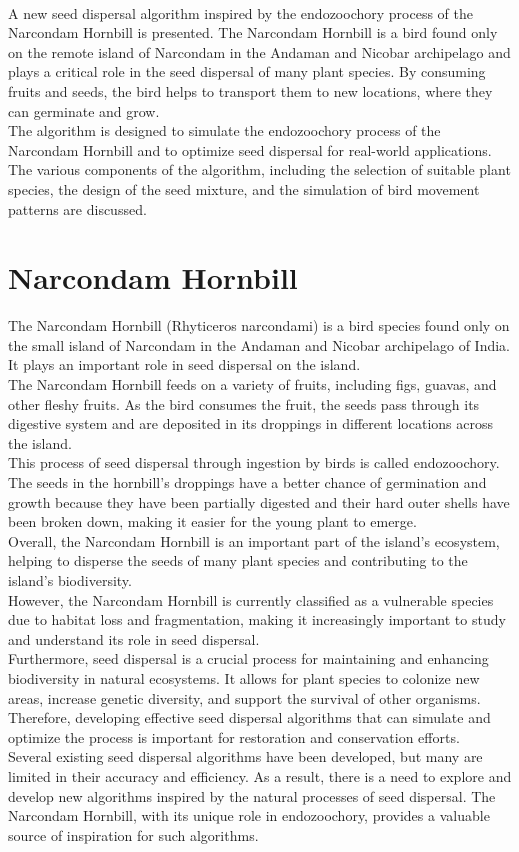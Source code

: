 \documentclass[pmlr,twocolumn,10pt]{jmlr}
\begin{document}
\\A new seed dispersal algorithm inspired by the endozoochory process of the Narcondam Hornbill is presented. The Narcondam Hornbill is a bird found only on the remote island of Narcondam in the Andaman and Nicobar archipelago and plays a critical role in the seed dispersal of many plant species. By consuming fruits and seeds, the bird helps to transport them to new locations, where they can germinate and grow. 
\\The algorithm is designed to simulate the endozoochory process of the Narcondam Hornbill and to optimize seed dispersal for real-world applications. The various components of the algorithm, including the selection of suitable plant species, the design of the seed mixture, and the simulation of bird movement patterns are discussed.
\section{Narcondam Hornbill}
The Narcondam Hornbill (Rhyticeros narcondami) is a bird species found only on the small island of Narcondam in the Andaman and Nicobar archipelago of India. It plays an important role in seed dispersal on the island.
\\The Narcondam Hornbill feeds on a variety of fruits, including figs, guavas, and other fleshy fruits. As the bird consumes the fruit, the seeds pass through its digestive system and are deposited in its droppings in different locations across the island.
\\This process of seed dispersal through ingestion by birds is called endozoochory. The seeds in the hornbill's droppings have a better chance of germination and growth because they have been partially digested and their hard outer shells have been broken down, making it easier for the young plant to emerge.
\\Overall, the Narcondam Hornbill is an important part of the island's ecosystem, helping to disperse the seeds of many plant species and contributing to the island's biodiversity.
\\However, the Narcondam Hornbill is currently classified as a vulnerable species due to habitat loss and fragmentation, making it increasingly important to study and understand its role in seed dispersal.
\\Furthermore, seed dispersal is a crucial process for maintaining and enhancing biodiversity in natural ecosystems. It allows for plant species to colonize new areas, increase genetic diversity, and support the survival of other organisms. Therefore, developing effective seed dispersal algorithms that can simulate and optimize the process is important for restoration and conservation efforts.
\\Several existing seed dispersal algorithms have been developed, but many are limited in their accuracy and efficiency. As a result, there is a need to explore and develop new algorithms inspired by the natural processes of seed dispersal. The Narcondam Hornbill, with its unique role in endozoochory, provides a valuable source of inspiration for such algorithms.
\end{document}
